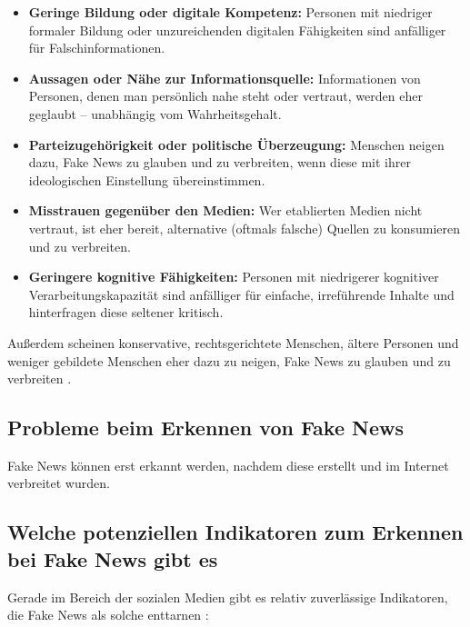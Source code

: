 \begin{itemize}
    \item \textbf{Geringe Bildung oder digitale Kompetenz:} Personen mit niedriger formaler Bildung oder unzureichenden digitalen Fähigkeiten sind anfälliger für Falschinformationen.
    
    \item \textbf{Aussagen oder Nähe zur Informationsquelle:} Informationen von Personen, denen man persönlich nahe steht oder vertraut, werden eher geglaubt – unabhängig vom Wahrheitsgehalt.
    
    \item \textbf{Parteizugehörigkeit oder politische Überzeugung:} Menschen neigen dazu, Fake News zu glauben und zu verbreiten, wenn diese mit ihrer ideologischen Einstellung übereinstimmen.
    
    \item \textbf{Misstrauen gegenüber den Medien:} Wer etablierten Medien nicht vertraut, ist eher bereit, alternative (oftmals falsche) Quellen zu konsumieren und zu verbreiten.
    
    \item \textbf{Geringere kognitive Fähigkeiten:} Personen mit niedrigerer kognitiver Verarbeitungskapazität sind anfälliger für einfache, irreführende Inhalte und hinterfragen diese seltener kritisch.
\end{itemize}

Außerdem scheinen konservative, rechtsgerichtete Menschen, ältere Personen und weniger gebildete Menschen eher dazu zu neigen, Fake News zu glauben und zu verbreiten \cite{socsci9100185}.

\subsection{Probleme beim Erkennen von Fake News}

Fake News können erst erkannt werden, nachdem diese erstellt und im Internet verbreitet wurden. \cite{Sharma:2024} %

\subsection{Welche potenziellen Indikatoren zum Erkennen bei Fake News gibt es}

Gerade im Bereich der sozialen Medien gibt es relativ zuverlässige Indikatoren, die Fake News als solche enttarnen \cite{Hartwig2021}:

